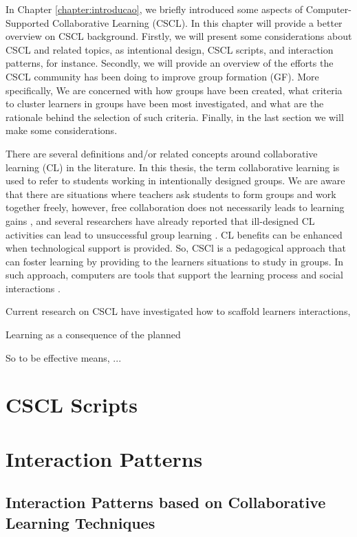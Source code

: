 \label{cha:background-cscl}
In Chapter \ref{chapter:introducao}, we briefly introduced some aspects of Computer-Supported Collaborative Learning (CSCL). 
In this chapter will provide a better overview on CSCL background. 
Firstly, we will present some considerations about CSCL and related topics, as intentional design, CSCL scripts, and interaction patterns, for instance. 
Secondly, we will provide an overview of the efforts the CSCL community has been doing to improve group formation (GF). 
More specifically, We are concerned with how groups have been created, what criteria to cluster learners in groups have been most investigated, and what are the rationale behind the selection of such criteria. 
Finally, in the last section we will make some considerations.

There are several definitions and/or related concepts around collaborative learning (CL) in the literature. 
In this thesis, the term collaborative learning is used to refer to students working in intentionally designed groups. 
We are aware that there are situations where teachers ask students to form groups and work together freely, however, free collaboration does not necessarily leads to learning gains \cite{An_Ontological_Engineering_Approach_tese}, and several researchers have already reported that ill-designed CL activities can lead to unsuccessful group learning \cite{Motivation_in_a_computer-supported_collaborative_learning}. 
CL benefits can be enhanced when technological support is provided. 
So, CSCl is a pedagogical approach that can foster learning by providing to the learners situations to study in groups. 
In such approach, computers are tools that support the learning process and social interactions \cite{CSCL_historical_perspective}. 

Current research on CSCL have investigated how to scaffold learners interactions, 

Learning as a consequence of the planned 

So to be effective means, ...

\section{CSCL Scripts}

\section{Interaction Patterns}

\subsection{Interaction Patterns based on Collaborative Learning Techniques}


